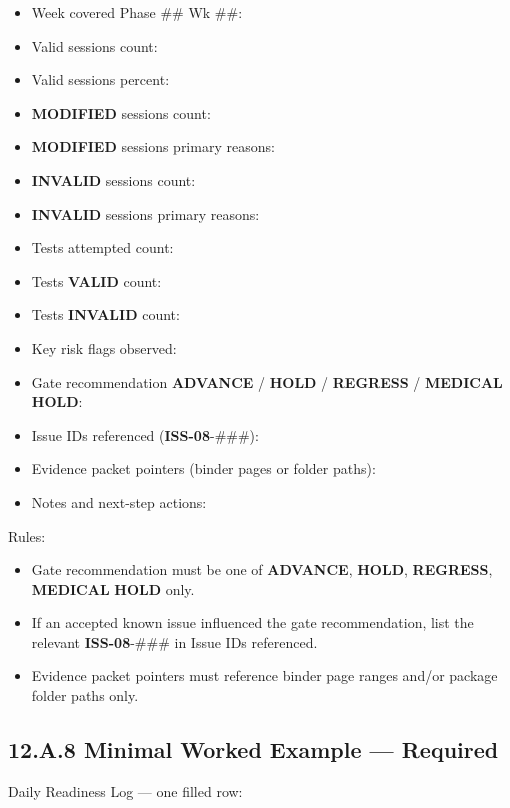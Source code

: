 \documentclass[10pt]{article}
\begin{document}
\begin{landscape}
\begin{itemize}
\item Week covered Phase \#\# Wk \#\#:
\item Valid sessions count:
\item Valid sessions percent:
\item \textbf{MODIFIED} sessions count:
\item \textbf{MODIFIED} sessions primary reasons:
\item \textbf{INVALID} sessions count:
\item \textbf{INVALID} sessions primary reasons:
\item Tests attempted count:
\item Tests \textbf{VALID} count:
\item Tests \textbf{INVALID} count:
\item Key risk flags observed:
\item Gate recommendation \textbf{ADVANCE} / \textbf{HOLD} / \textbf{REGRESS} / \textbf{MEDICAL} \textbf{HOLD}:
\item Issue IDs referenced (\textbf{ISS-08}-\#\#\#):
\item Evidence packet pointers (binder pages or folder paths):
\item Notes and next-step actions:
\end{itemize}

Rules:

\begin{itemize}
\item Gate recommendation must be one of \textbf{ADVANCE}, \textbf{HOLD}, \textbf{REGRESS}, \textbf{MEDICAL} \textbf{HOLD} only.
\item If an accepted known issue influenced the gate recommendation, list the relevant \textbf{ISS-08}-\#\#\# in Issue IDs referenced.
\item Evidence packet pointers must reference binder page ranges and/or package folder paths only.
\end{itemize}

\newpage

\subsection*{12.A.8 Minimal Worked Example — Required}
{}

Daily Readiness Log — one filled row:

\begingroup
\scriptsize
\setlength{\tabcolsep}{2pt}
\renewcommand{\arraystretch}{1.12}


\end{landscape}
\end{document}
